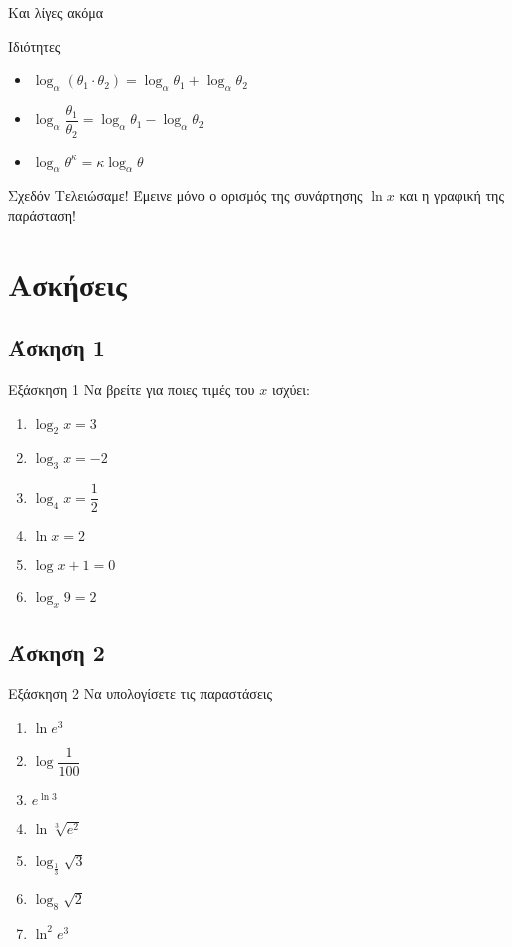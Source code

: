 \documentclass[greek]{beamer}
\begin{document}
\begin{frame}[label=Ιδιότητες]{Και λίγες ακόμα}
 \begin{block}{Ιδιότητες}
  \begin{itemize}
   \item<1-> $\log_α\left( θ_1\cdot θ_2 \right)=\log_αθ_1+\log_αθ_2 $
   \item<2-> $\log_α\dfrac{θ_1}{θ_2}=\log_αθ_1-\log_αθ_2 $
   \item<3-> $\log_αθ^κ=κ\log_αθ$
  \end{itemize}
 \end{block}
 \hyperlink{Απόδειξη1}{}
\end{frame}

\begin{frame}{Σχεδόν Τελειώσαμε!}
 Έμεινε μόνο ο ορισμός της συνάρτησης $\ln x$ και η γραφική της παράσταση!
\end{frame}

\section{Ασκήσεις}
\subsection{Άσκηση 1}
\begin{frame}[label=Άσκηση1,t]{Εξάσκηση 1}
 Να βρείτε για ποιες τιμές του $x$ ισχύει:
 \begin{enumerate}
  \item<1-> $\log_2x=3$
  \item<2-> $\log_3x=-2$
  \item<3-> $\log_4x=\dfrac{1}{2}$
  \item<4-> $\ln x=2$
  \item<5-> $\log x+1=0$
  \item<6-> $\log_x9=2$
 \end{enumerate}

\end{frame}

\subsection{Άσκηση 2}
\begin{frame}[label=Άσκηση2,t]{Εξάσκηση 2}
 Να υπολογίσετε τις παραστάσεις
 \begin{enumerate}
  \item<1-> $\ln e^3$
   \item<2-> $\log\dfrac{1}{100}$
    \item<3-> $e^{\ln 3}$
     \item<4-> $\ln \sqrt[3]{e^2}$
      \item<5-> $\log_{\frac{1}{3}}\sqrt{3}$
       \item<6-> $\log_8\sqrt{2}$
        \item<7-> $\ln^2e^3$
 \end{enumerate}

 \hyperlink{Θεωρία1}{}
\end{frame}
\end{document}
